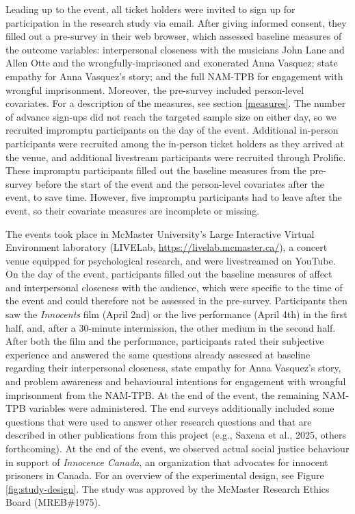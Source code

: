 \documentclass[
  man,floatsintext]{apa6}
\begin{document}
Leading up to the event, all ticket holders were invited to sign up for participation in the research study via email. After giving informed consent, they filled out a pre-survey in their web browser, which assessed baseline measures of the outcome variables: interpersonal closeness with the musicians John Lane and Allen Otte and the wrongfully-imprisoned and exonerated Anna Vasquez; state empathy for Anna Vasquez's story; and the full NAM-TPB for engagement with wrongful imprisonment. Moreover, the pre-survey included person-level covariates. For a description of the measures, see section \ref{measures}. The number of advance sign-ups did not reach the targeted sample size on either day, so we recruited impromptu participants on the day of the event. Additional in-person participants were recruited among the in-person ticket holders as they arrived at the venue, and additional livestream participants were recruited through Prolific. These impromptu participants filled out the baseline measures from the pre-survey before the start of the event and the person-level covariates after the event, to save time. However, five impromptu participants had to leave after the event, so their covariate measures are incomplete or missing.

The events took place in McMaster University's Large Interactive Virtual Environment laboratory (LIVELab, \url{https://livelab.mcmaster.ca/}), a concert venue equipped for psychological research, and were livestreamed on YouTube. On the day of the event, participants filled out the baseline measures of affect and interpersonal closeness with the audience, which were specific to the time of the event and could therefore not be assessed in the pre-survey. Participants then saw the \textit{Innocents} film (April 2nd) or the live performance (April 4th) in the first half, and, after a 30-minute intermission, the other medium in the second half. After both the film and the performance, participants rated their subjective experience and answered the same questions already assessed at baseline regarding their interpersonal closeness, state empathy for Anna Vasquez's story, and problem awareness and behavioural intentions for engagement with wrongful imprisonment from the NAM-TPB. At the end of the event, the remaining NAM-TPB variables were administered. The end surveys additionally included some questions that were used to answer other research questions and that are described in other publications from this project (e.g., Saxena et al., 2025, others forthcoming). At the end of the event, we observed actual social justice behaviour in support of \textit{Innocence Canada}, an organization that advocates for innocent prisoners in Canada. For an overview of the experimental design, see Figure \ref{fig:study-design}. The study was approved by the McMaster Research Ethics Board (MREB\#1975).
\end{document}
